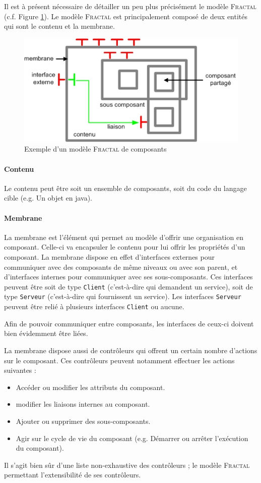 \documentclass[12pt,a4paper,utf8x]{report}
\newcommand\fractal{\textsc{Fractal}}
\begin{document}
Il est à présent nécessaire de détailler un peu plus précisément le modèle \fractal{} (c.f. Figure \ref{fig:Comp}). Le modèle \fractal{} est principalement composé de deux entités qui sont le contenu et la membrane. 
\begin{figure}[htbp] %
  \center
  \includegraphics{img/fractal_component}
  \caption{Exemple d'un modèle \fractal{} de composants} %
 \label{fig:Comp} %
\end{figure}

\paragraph{Contenu}Le contenu peut être soit un ensemble de composants, soit du code du langage cible (e.g. Un objet en java).
\paragraph{Membrane} La membrane est l'élément qui permet au modèle d'offrir une organisation en composant. Celle-ci va encapsuler le contenu pour lui offrir les propriétés d'un composant. La membrane dispose en effet d'interfaces externes pour communiquer avec des composants de même niveaux ou avec son parent, et d'interfaces internes pour communiquer avec ses sous-composants. Ces interfaces peuvent être soit de type \verb+Client+ (c'est-à-dire qui demandent un service), soit de type \verb+Serveur+ (c'est-à-dire qui fournissent un service). Les interfaces \verb+Serveur+ peuvent être relié à plusieurs interfaces \verb+Client+ ou aucune. 

Afin de pouvoir communiquer entre composants, les interfaces de ceux-ci doivent bien évidemment être liées. 

La membrane dispose aussi de contrôleurs qui offrent un certain nombre d'actions sur le composant. Ces contrôleurs peuvent notamment effectuer les actions suivantes :
\begin{itemize}
 \item Accéder ou modifier les attributs du composant.
 \item modifier les liaisons internes au composant.
 \item Ajouter ou supprimer des sous-composants.
 \item Agir sur le cycle de vie du composant (e.g. Démarrer ou arrêter l'exécution du composant).
\end{itemize}
Il s'agit bien sûr d'une liste non-exhaustive des contrôleurs ; le modèle \fractal{} permettant l'extensibilité de ses contrôleurs. 
\end{document}
